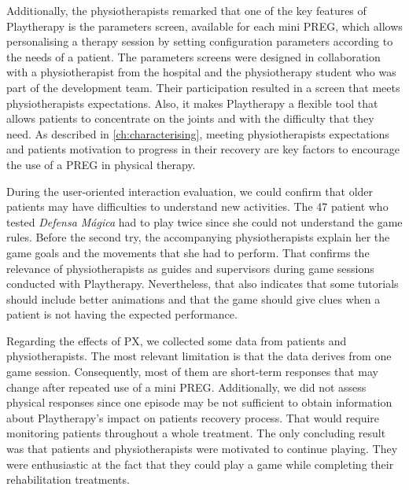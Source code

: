 Additionally, the physiotherapists remarked that one of the key features of Playtherapy is the parameters screen, available for each mini \ac{PREG}, which allows personalising a therapy session by setting configuration parameters according to the needs of a patient. The parameters screens were designed in collaboration with a physiotherapist from the hospital and the physiotherapy student who was part of the development team. Their participation resulted in a screen that meets physiotherapists expectations. Also, it makes Playtherapy a flexible tool that allows patients to concentrate on the joints and with the difficulty that they need. As described in \autoref{ch:characterising}, meeting physiotherapists expectations and patients motivation to progress in their recovery are key factors to encourage the use of a \ac{PREG} in physical therapy.

During the user-oriented interaction evaluation, we could confirm that older patients may have difficulties to understand new activities. The 47 patient who tested \textit{Defensa M\'agica} had to play twice since she could not understand the game rules. Before the second try, the accompanying physiotherapists explain her the game goals and the movements that she had to perform. That confirms the relevance of physiotherapists as guides and supervisors during game sessions conducted with Playtherapy. Nevertheless, that also indicates that some tutorials should include better animations and that the game should give clues when a patient is not having the expected performance.

Regarding the effects of \ac{PX}, we collected some data from patients and physiotherapists. The most relevant limitation is that the data derives from one game session. Consequently, most of them are short-term responses that may change after repeated use of a mini \ac{PREG}. Additionally, we did not assess physical responses since one episode may be not sufficient to obtain information about Playtherapy's impact on patients recovery process. That would require monitoring patients throughout a whole treatment. The only concluding result was that patients and physiotherapists were motivated to continue playing. They were enthusiastic at the fact that they could play a game while completing their rehabilitation treatments.

